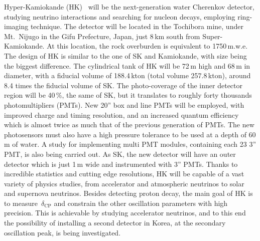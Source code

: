 Hyper-Kamiokande (HK)~\cite{Abe:2018uyc} will be the next-generation water Cherenkov detector, %
studying neutrino interactions and searching for nucleon decays, employing ring-imaging technique.
The detector will be located in the Tochibora mine, under Mt.\ Nijugo in the Gifu Prefecture, Japan, 
just 8\,km south from Super-Kamiokande.
At this location, the rock overburden is equivalent to 1750\,m.w.e.
The design of HK is similar to the one of SK and Kamiokande, with size being the biggest difference.
The cylindrical tank of HK will be 72\,m high and 68\,m in diameter, with a fiducial volume of 188.4\,kton (total volume 257.8\,kton), %
around 8.4 times the fiducial volume of SK.
The photo-coverage of the inner detector region will be 40\,\%, the same of SK, %
but it translates to roughly forty thousands photomultipliers (PMTs).
New 20'' box and line PMTs will be employed, with improved charge and timing resolution, %
and an increased quantum efficiency which is almost twice as much that of the previous generation of PMTs.
The new photosensors must also have a high pressure tolerance to be used at a depth of 60\,m of water.
A study for implementing multi PMT modules, containing each 23 3'' PMT, is also being carried out.
As SK, the new detector will have an outer detector which is just 1\,m wide and instrumented with 3'' PMTs.
Thanks to incredible statistics and cutting edge resolutions, HK will be capable of a vast variety of physics studies, %
from accelerator and atmospheric neutrinos to solar and supernova neutrinos.
Besides detecting proton decay, the main goal of HK is to measure~$\delta_\text{CP}$ and constrain the other oscillation parameters %
with high precision.
This is achievable by studying accelerator neutrinos, and to this end the possibility of installing a second detector in Korea, %
at the secondary oscillation peak, is being investigated.

